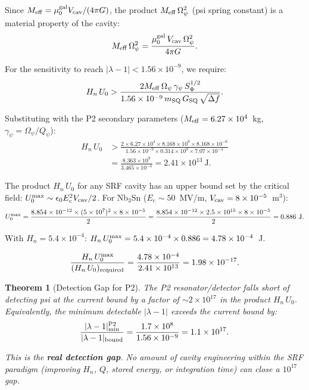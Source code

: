 \documentclass[11pt,twocolumn]{article}
\newcommand{\lam}{\lambda}
\newcommand{\Opsi}{\Omega_\psi}
\newcommand{\gpsi}{\gamma_\psi}
\newcommand{\Meff}{M_{\rm eff}}
\newcommand{\ee}[1]{\times 10^{#1}}
\newcommand{\Qpsi}{Q_\psi}
\newcommand{\Heff}{H_n}
\newcommand{\Ucav}{U_0}
\newcommand{\Vcav}{V_{\rm cav}}
\newcommand{\muG}{\mu_0^{\rm gal}}
\newtheorem{theorem}{Theorem}[section]
\theoremstyle{definition}
\theoremstyle{remark}
\begin{document}
Since $\Meff = \muG\Vcav/(4\pi G)$, the product $\Meff\,\Opsi^2$
(psi spring constant) is a material property of the cavity:
\begin{equation}
\Meff\,\Opsi^2 = \frac{\muG\,\Vcav\,\Opsi^2}{4\pi G}.
\label{eq:spring_constant}
\end{equation}

For the sensitivity to reach $|\lam-1| < 1.56\ee{-9}$, we require:
\begin{equation}
\Heff\,\Ucav > \frac{2\Meff\,\Opsi\,\gpsi\,S_\Phi^{1/2}}
{1.56\ee{-9}\,m_{\rm SQ}\,G_{\rm SQ}\,\sqrt{\Delta f}}.
\label{eq:requirement}
\end{equation}

Substituting with the P2 secondary parameters
($\Meff = 6.27\ee{4}$~kg, $\gpsi = \Opsi/\Qpsi$):
\begin{align}
\Heff\,\Ucav &> \frac{2\times 6.27\ee{4}\times 8.168\ee{9}
\times 8.168\times 10^{-6}}
{1.56\ee{-9}\times 0.314\times 10^9\times 7.07\ee{-4}}
\nonumber\\
&= \frac{8.363\ee{9}}{3.465\ee{-4}}
= 2.41\ee{13}~\text{J}.
\label{eq:HU_requirement}
\end{align}

The product $\Heff\,\Ucav$ for any SRF cavity has an upper bound set by
the critical field: $\Ucav^{\rm max} \sim \epsilon_0 E_c^2 \Vcav/2$.
For Nb$_3$Sn ($E_c \sim 50$~MV/m, $\Vcav = 8\ee{-5}$~m$^3$):
\begin{equation}
\Ucav^{\rm max} = \frac{8.854\ee{-12}\times(5\ee{7})^2\times 8\ee{-5}}{2}
= \frac{8.854\ee{-12}\times 2.5\ee{15}\times 8\ee{-5}}{2}
= 0.886~\text{J}.
\label{eq:U_max}
\end{equation}

With $\Heff = 5.4\ee{-4}$:
$\Heff\,\Ucav^{\rm max} = 5.4\ee{-4}\times 0.886 = 4.78\ee{-4}$~J.

\begin{equation}
\frac{\Heff\,\Ucav^{\rm max}}{(\Heff\,\Ucav)_{\rm required}}
= \frac{4.78\ee{-4}}{2.41\ee{13}} = 1.98\ee{-17}.
\label{eq:shortfall}
\end{equation}

\begin{theorem}[Detection Gap for P2]
\label{thm:detection_gap}
The P2 resonator/detector falls short of detecting psi at the current
bound by a factor of $\sim 2\ee{17}$ in the product $\Heff\,\Ucav$.
Equivalently, the minimum detectable $|\lam-1|$ exceeds the current
bound by:
\begin{equation}
\frac{|\lam-1|_{\rm min}^{\rm P2}}{|\lam-1|_{\rm bound}}
= \frac{1.7\ee{8}}{1.56\ee{-9}} = 1.1\ee{17}.
\label{eq:gap_factor}
\end{equation}

This is the \textbf{real detection gap}. No amount of cavity engineering
within the SRF paradigm (improving $\Heff$, $Q$, stored energy, or
integration time) can close a $10^{17}$ gap.
\end{theorem}
\end{document}
